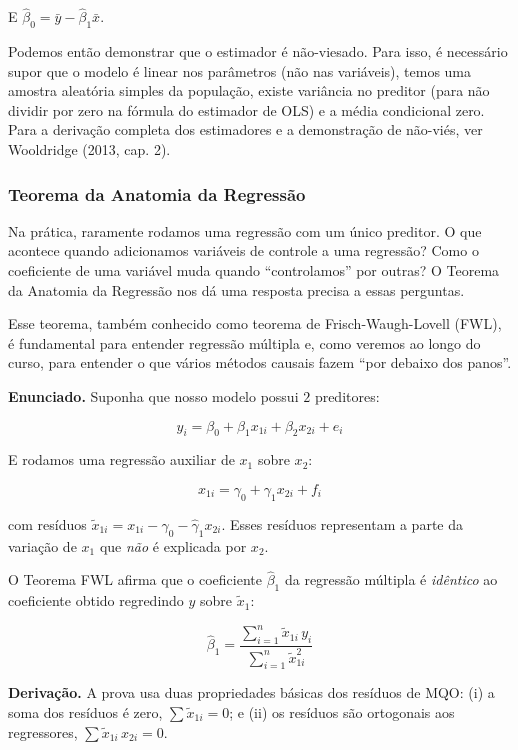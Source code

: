 \documentclass[
]{article}
\begin{document}
E \(\hat{\beta}_0 = \bar{y} - \hat{\beta}_1\bar{x}\).

Podemos então demonstrar que o estimador é não-viesado. Para isso, é necessário supor que o modelo é linear nos parâmetros (não nas variáveis), temos uma amostra aleatória simples da população, existe variância no preditor (para não dividir por zero na fórmula do estimador de OLS) e a média condicional zero. Para a derivação completa dos estimadores e a demonstração de não-viés, ver Wooldridge (2013, cap. 2).

\subsubsection{Teorema da Anatomia da Regressão}\label{teorema-da-anatomia-da-regressuxe3o}

Na prática, raramente rodamos uma regressão com um único preditor. O que acontece quando adicionamos variáveis de controle a uma regressão? Como o coeficiente de uma variável muda quando ``controlamos'' por outras? O Teorema da Anatomia da Regressão nos dá uma resposta precisa a essas perguntas.

Esse teorema, também conhecido como teorema de Frisch-Waugh-Lovell (FWL), é fundamental para entender regressão múltipla e, como veremos ao longo do curso, para entender o que vários métodos causais fazem ``por debaixo dos panos''.

\textbf{Enunciado.} Suponha que nosso modelo possui \(2\) preditores:

\[y_i=\beta_0+\beta_1 x_{1i}+ \beta_2 x_{2i}+ e_i\]

E rodamos uma regressão auxiliar de \(x_1\) sobre \(x_2\):

\[x_{1i}=\gamma_0+\gamma_{1}x_{2i} + f_i\]

com resíduos \(\tilde{x}_{1i}=x_{1i} - \hat{\gamma}_0 - \hat{\gamma}_1 x_{2i}\). Esses resíduos representam a parte da variação de \(x_1\) que \emph{não} é explicada por \(x_2\).

O Teorema FWL afirma que o coeficiente \(\hat{\beta}_1\) da regressão múltipla é \emph{idêntico} ao coeficiente obtido regredindo \(y\) sobre \(\tilde{x}_1\):

\[\hat{\beta}_1 = \frac{\sum_{i=1}^n \tilde{x}_{1i}\, y_i}{\sum_{i=1}^n \tilde{x}_{1i}^2}\]

\textbf{Derivação.} A prova usa duas propriedades básicas dos resíduos de MQO: (i) a soma dos resíduos é zero, \(\sum \tilde{x}_{1i} = 0\); e (ii) os resíduos são ortogonais aos regressores, \(\sum \tilde{x}_{1i}\, x_{2i} = 0\).
\end{document}
